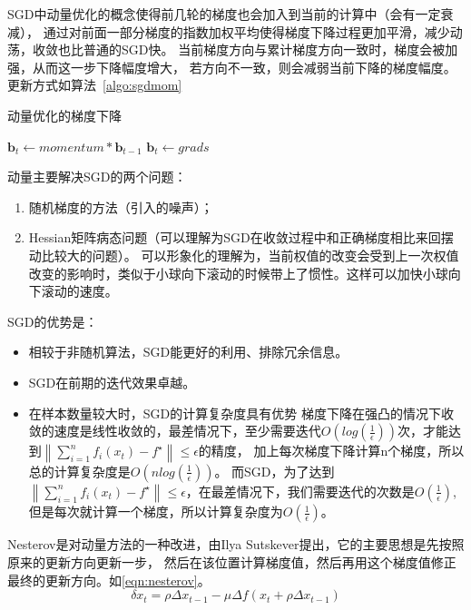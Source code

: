 \documentclass[a4paper,twoside,twocolumn]{article}
\begin{document}
\begin{spacing}{1.2}
SGD中动量优化的概念使得前几轮的梯度也会加入到当前的计算中（会有一定衰减），
通过对前面一部分梯度的指数加权平均使得梯度下降过程更加平滑，减少动荡，收敛也比普通的SGD快。
当前梯度方向与累计梯度方向一致时，梯度会被加强，从而这一步下降幅度增大，
若方向不一致，则会减弱当前下降的梯度幅度。更新方式如算法~\ref{algo:sgdmom}

\begin{algorithm}[htbp]
	\caption{动量优化的梯度下降}
	\label{algo:sgdmom}
	\begin{algorithmic}[1]
		\State $\mathbf{b}_{t} \gets momentum*\mathbf{b}_{t-1}$
		\Else
		\State $\mathbf{b}_{t} \gets grads$
		\EndIf
	\end{algorithmic}
\end{algorithm}	

动量主要解决SGD的两个问题：
\begin{enumerate}
	\item 随机梯度的方法（引入的噪声）；
	\item Hessian矩阵病态问题（可以理解为SGD在收敛过程中和正确梯度相比来回摆动比较大的问题）。  可以形象化的理解为，当前权值的改变会受到上一次权值改变的影响时，类似于小球向下滚动的时候带上了惯性。这样可以加快小球向下滚动的速度。
\end{enumerate}
SGD的优势是：
\begin{itemize}
	\item 相较于非随机算法，SGD能更好的利用、排除冗余信息。
	\item SGD在前期的迭代效果卓越。
	\item 在样本数量较大时，SGD的计算复杂度具有优势
	梯度下降在强凸的情况下收敛的速度是线性收敛的，最差情况下，至少需要迭代$O(log(\frac{1}{\epsilon}))$次，才能达到$\left\|\sum_{i=1}^{n} f_{i}\left(x_{t}\right)-f^{\star}\right\| \leqslant \epsilon$的精度，
	加上每次梯度下降计算n个梯度，所以总的计算复杂度是$O(nlog(\frac{1}{\epsilon}))$。
	而SGD，为了达到$\left\|\sum_{i=1}^{n} f_{i}\left(x_{t}\right)-f^{\star}\right\| \leqslant \epsilon$，在最差情况下，我们需要迭代的次数是$O(\frac{1}{\epsilon})$,但是每次就计算一个梯度，所以计算复杂度为$O(\frac{1}{\epsilon})$。
\end{itemize}

Nesterov是对动量方法的一种改进，由Ilya Sutskever提出，它的主要思想是先按照原来的更新方向更新一步，
然后在该位置计算梯度值，然后再用这个梯度值修正最终的更新方向。如\eqref{eqn:nesterov}。
\begin{equation}
	\label{eqn:nesterov}
	\delta x_t=\rho \Delta x_{t-1}-\mu \Delta f(x_t+\rho \Delta x_{t-1})
\end{equation}


\end{spacing}
\end{document}
